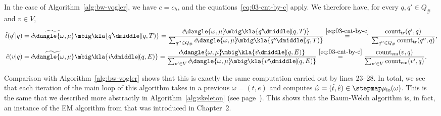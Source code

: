 In the case of Algorithm~\ref{alg:bw-vogler}, we have $c=c_h$, and the
equations~\eqref{eq:03-cnt-by-c} apply. We therefore have, for every $q,q'\in
Q_\#$ and $v\in V$,
\begin{align*}
 \hat t(q'|q)
 &= \widetilde{c\!\dangle{\omega,\mu}}\mbig\kla{q'\npipe(q,T)}
 = \frac{c\!\dangle{\omega,\mu}\!\mbig\kla{q'\npipe(q,T)}}{\sum_{q''\in Q_\#}c\!\dangle{\omega,\mu}\!\mbig\kla{q''\npipe(q,T)}}
 \overset{\eqref{eq:03-cnt-by-c}}= \frac{\cnt_\mathrm{tr}(q',q)}{\sum_{q''\in Q_\#} \cnt_\mathrm{tr}(q'',q)}, \\
 \hat e(v|q)
 &= \widetilde{c\!\dangle{\omega,\mu}}\mbig\kla{v\npipe(q,E)}
 = \frac{c\!\dangle{\omega,\mu}\!\mbig\kla{v\npipe(q,E)}}{\sum_{v'\in V}c\!\dangle{\omega,\mu}\!\mbig\kla{v'\npipe(q,E)}}
 \overset{\eqref{eq:03-cnt-by-c}}= \frac{\cnt_\mathrm{em}(v,q)}{\sum_{v'\in V} \cnt_\mathrm{em}(v',q)}.
\end{align*}

Comparison with Algorithm~\ref{alg:bw-vogler} shows that this is exactly the
same computation carried out by lines 23--28. In total, we see that each
iteration of the main loop of this algorithm takes in a previous $\omega=(t,e)$
and computes $\hat\omega=(\hat t,\hat e)\in\stepmap\mu_\mathrm{io}(\omega)$.
This is the same that we described more abstractly in
Algorithm~\ref{alg:skeleton} (see page~\pageref{alg:skeleton}). This shows that
the Baum-Welch algorithm is, in fact, an instance of the EM algorithm from
\cite{bucstuvog15} that was introduced in Chapter~2.
